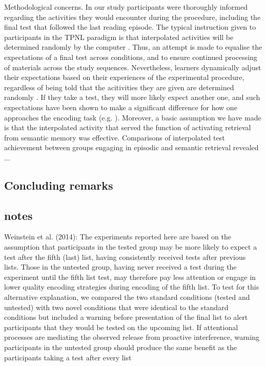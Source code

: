 \documentclass[../main.tex]{subfiles}
\begin{document}
Methodological concerns. In our study participants were thoroughly informed
regarding the activities they would encounter during the procedure, including
the final test that followed the last reading episode. The typical instruction
given to participants in the TPNL paradigm is that interpolated activities 
will be determined randomly by the computer \cite{Yang}. Thus, an attempt is 
made to equalise the expectations of a final test across conditions, and to 
ensure continued processing of materials across the study sequences. 
Nevertheless,
learners dynamically adjust their expectations based on their experiences of 
the experimental procedure, regardless of being told that the acitivities they
are given are determined randomly \citep{weinsteinRoleTestExpectancy2014}. If
they take a test, they will more likely expect another one, and such 
expectations
have been shown to make a significant difference for how one approaches
the encoding task (e.g. \citealp{szpunarExpectationFinalCumulative2007}).
Moreover, a basic assumption we have made is that the interpolated activity that
served the function of activating retrieval from semantic memory was effective.
Comparisons of interpolated test achievement between groups engaging in episodic
and semantic retrieval revealed ...



\subsection{Concluding remarks}









\subsection{notes}

Weinstein et al. (2014):
The experiments reported here are based on the assumption that
participants in the tested group may be more likely to expect a test
after the fifth (last) list, having consistently received tests after
previous lists. Those in the untested group, having never received
a test during the experiment until the fifth list test, may therefore
pay less attention or engage in lower quality encoding strategies
during encoding of the fifth list. To test for this alternative explanation, 
we compared the two standard conditions (tested and
untested) with two novel conditions that were identical to the
standard conditions but included a warning before presentation of
the final list to alert participants that they would be tested on the
upcoming list. If attentional processes are mediating the observed
release from proactive interference, warning participants in the
untested group should produce the same benefit as the participants
taking a test after every list
\end{document}

